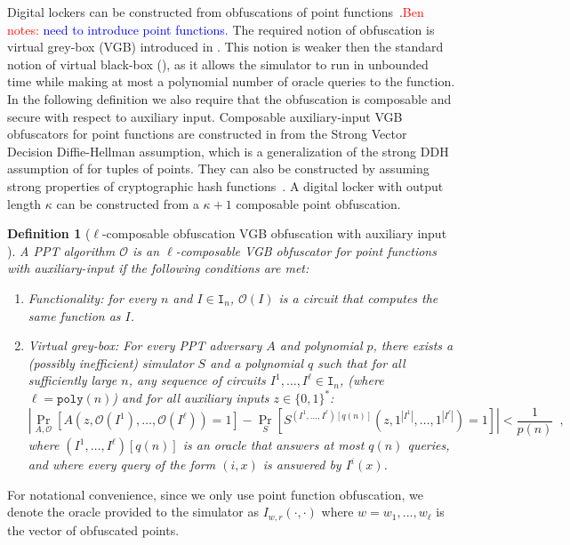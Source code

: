 \documentclass[11pt]{article}
\newcommand{\zo}{\ensuremath{\{0, 1\}}}
\newcommand{\poly}{\ensuremath{\mathtt{poly}}\xspace}
\newtheorem{definition}[theorem]{Definition}
\newcommand{\authnote}[2]{{\textcolor{red}{\textsf{#1 notes: }\textcolor{blue}{ #2}}\marginpar{\textcolor{red}{\textbf{!!!!!}}}}}
\newcommand{\authnote}[2]{}
\newcommand{\bnote}[1]{{\authnote{Ben}{#1}}}
\begin{document}
Digital lockers can be constructed from obfuscations of point functions~\cite{canetti2008obfuscating}.\bnote{need to introduce point functions.}  
The required notion of obfuscation is virtual grey-box (VGB) introduced in \cite{bitansky2010strong}. This notion is weaker then the standard notion of virtual black-box (\cite{barak2001possibility}), as it allows the simulator to run in unbounded time while making at most a polynomial number of oracle queries to the function. In the following definition we also require that the obfuscation is composable and secure with respect to auxiliary input. Composable auxiliary-input VGB obfuscators for point functions are constructed in \cite[Theorem 6.1]{bitansky2010strong} from the Strong Vector Decision Diffie-Hellman assumption, which is a generalization of the strong DDH assumption of \cite{canetti1997towards} for tuples of points. They can also be constructed by assuming strong properties of cryptographic hash functions~\cite{canetti1997towards}.  A digital locker with output length $\kappa$ can be constructed from a $\kappa+1$ composable point obfuscation.

\begin{definition}[$\ell$-composable obfuscation VGB obfuscation with auxiliary input \cite{bitansky2010strong}]
\label{def:obf} A PPT algorithm $\mathcal{O}$ is an $\ell$-composable VGB obfuscator for point functions with auxiliary-input if the following conditions are met:
\begin{enumerate}
\item \emph{Functionality:} for every $n$ and $I \in \mathtt{I}_n$, $\mathcal{O}(I)$ is a circuit that computes the same function as $I$.
\item \emph{Virtual grey-box:}  For every PPT adversary $A$ and polynomial $p$, there exists a (possibly inefficient) simulator $S$ and a polynomial $q$ such that for all sufficiently large $n$, any  sequence of circuits $I^1,\dots,I^\ell \in \mathtt{I}_n$, (where $\ell=\poly(n)$) and for all auxiliary inputs $z\in \zo^*$:
\[
|\Pr_{A,\mathcal{O}}[A(z,\mathcal{O}(I^1),\dots,\mathcal{O}(I^\ell)) = 1] - \Pr_{S}[S^{(I^1,\dots,I^\ell)[q(n)]}(z, 1^{|I^1|},\dots,1^{|I^\ell|}) = 1] | < \frac{1}{p(n)} \enspace,
\]
where $(I^1,\dots,I^\ell)[q(n)]$ is an oracle that answers at most $q(n)$ queries, and where every query of the form $(i,x)$ is answered by $I^i(x)$.
\end{enumerate}
\end{definition}
For notational convenience, since we only use point function obfuscation, we denote the oracle provided to the simulator as $I_{w, r}(\cdot, \cdot)$ where $w = w_1,..., w_\ell$ is the vector of obfuscated points.
\end{document}
